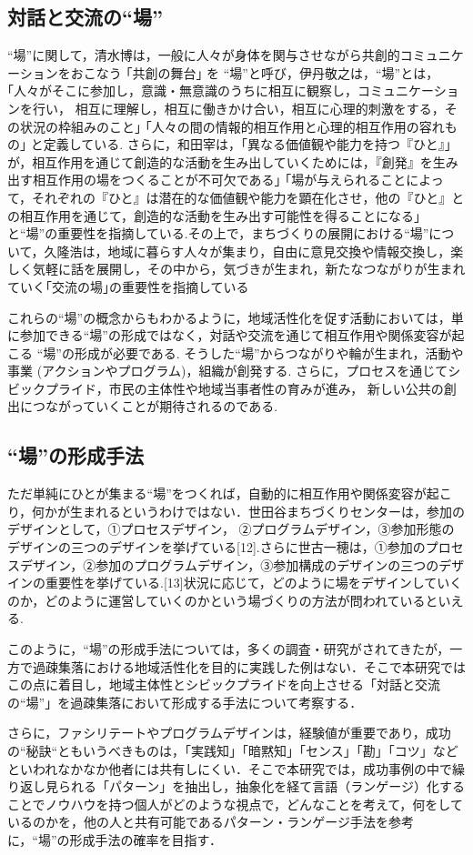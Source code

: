 \documentclass[a4paper]{jsarticle}
\begin{document}
\subsection{対話と交流の“場”}
“場”に関して，清水博は，一般に人々が身体を関与させながら共創的コミュニケーションをおこなう ｢共創の舞台｣ を “場”と呼び\cite{9}，伊丹敬之は，“場”とは，｢人々がそこに参加し，意識・無意識のうちに相互に観察し，コミュニケーションを行い， 相互に理解し，相互に働きかけ合い，相互に心理的刺激をする，その状況の枠組みのこと｣ ｢人々の間の情報的相互作用と心理的相互作用の容れもの｣ と定義している\cite{10}. さらに，和田宰は，｢異なる価値観や能力を持つ『ひと』｣ が，相互作用を通じて創造的な活動を生み出していくためには，『創発』を生み出す相互作用の場をつくることが不可欠である｣ ｢場が与えられることによって，それぞれの『ひと』は潜在的な価値観や能力を顕在化させ，他の『ひと』との相互作用を通じて，創造的な活動を生み出す可能性を得ることになる｣ と“場”の重要性を指摘している\cite{11}.その上で，まちづくりの展開における“場”について，久隆浩は，地域に暮らす人々が集まり，自由に意見交換や情報交換し，楽しく気軽に話を展開し，その中から，気づきが生まれ，新たなつながりが生まれていく｢交流の場｣の重要性を指摘している\cite{12}\par
これらの“場”の概念からもわかるように，地域活性化を促す活動においては，単に参加できる“場”の形成ではなく，対話や交流を通じて相互作用や関係変容が起こる “場”の形成が必要である. そうした“場”からつながりや輪が生まれ，活動や事業 (アクションやプログラム)，組織が創発する. さらに，プロセスを通じてシビックプライド，市民の主体性や地域当事者性の育みが進み， 新しい公共の創出につながっていくことが期待されるのである.\par
\subsection{“場”の形成手法}
ただ単純にひとが集まる“場”をつくれば，自動的に相互作用や関係変容が起こり，何かが生まれるというわけではない．世田谷まちづくりセンターは，参加のデザインとして，①プロセスデザイン， ②プログラムデザイン，③参加形態のデザインの三つのデザインを挙げている[12].さらに世古一穂は，①参加のプロセスデザイン，②参加のプログラムデザイン，③参加構成のデザインの三つのデザインの重要性を挙げている.[13]状況に応じて，どのように場をデザインしていくのか，どのように運営していくのかという場づくりの方法が問われているといえる.\par
このように，“場”の形成手法については，多くの調査・研究がされてきたが，一方で過疎集落における地域活性化を目的に実践した例はない．そこで本研究ではこの点に着目し，地域主体性とシビックプライドを向上させる「対話と交流の“場”」を過疎集落において形成する手法について考察する．\par
さらに，ファシリテートやプログラムデザインは，経験値が重要であり，成功の“秘訣“ともいうべきものは，「実践知」「暗黙知」「センス」「勘」「コツ」などといわれなかなか他者には共有しにくい．そこで本研究では，成功事例の中で繰り返し見られる「パターン」を抽出し，抽象化を経て言語（ランゲージ）化することでノウハウを持つ個人がどのような視点で，どんなことを考えて，何をしているのかを，他の人と共有可能であるパターン・ランゲージ手法\cite{ptn}を参考に，“場”の形成手法の確率を目指す．\par
\end{document}
